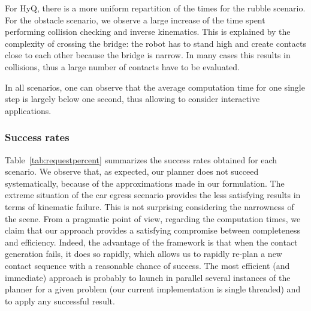 For HyQ, there is a more uniform repartition of the times for the rubble scenario. For the obstacle scenario,
we observe a large increase of the time spent performing collision checking and inverse kinematics. This is explained
by the complexity of crossing the bridge: the robot has to stand high and create contacts close to each other because
the bridge is narrow. In many cases this results in collisions, thus a large number of contacts have to be evaluated.

In all scenarios, one can observe that the average computation time for one single step is largely below one second,
thus allowing to consider \gls{interactive} applications. 


\subsubsection{Success rates}
Table~\ref{tab:requestpercent} summarizes the success rates obtained for each scenario.
We observe that, as expected, our planner does not succeed systematically, because of the approximations made in our formulation. The extreme situation of the car egress scenario provides the less satisfying results in terms of kinematic failure. This is not
surprising considering the narrowness of the scene.
From a pragmatic point of view, regarding the computation times, we claim that our approach provides a satisfying compromise between completeness and efficiency.
Indeed, the advantage of the framework is that when the contact generation fails, it does so rapidly, which allows us to rapidly re-plan a new contact sequence with a reasonable chance of success.
The most efficient (and immediate) approach is probably to launch in parallel several instances of the planner for a given problem (our current implementation is single threaded) and to apply any successful result.

